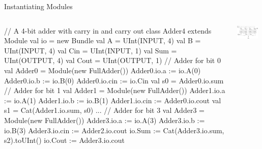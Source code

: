 \documentclass[xcolor=pdflatex,dvipsnames,table]{beamer}
\begin{document}
\begin{frame}[fragile]{Instantiating Modules}

\begin{columns}


{
\begin{scala}
// A 4-bit adder with carry in and carry out
class Adder4 extends Module {
  val io = new Bundle {
    val A    = UInt(INPUT, 4)
    val B    = UInt(INPUT, 4)
    val Cin  = UInt(INPUT, 1)
    val Sum  = UInt(OUTPUT, 4)
    val Cout = UInt(OUTPUT, 1)
  }
  // Adder for bit 0
  val Adder0 = Module(new FullAdder())
  Adder0.io.a   := io.A(0)
  Adder0.io.b   := io.B(0)
  Adder0.io.cin := io.Cin
  val s0 = Adder0.io.sum
  // Adder for bit 1
  val Adder1 = Module(new FullAdder())
  Adder1.io.a   := io.A(1)
  Adder1.io.b   := io.B(1)
  Adder1.io.cin := Adder0.io.cout
  val s1 = Cat(Adder1.io.sum, s0)
  ...
  // Adder for bit 3
  val Adder3 = Module(new FullAdder())
  Adder3.io.a   := io.A(3)
  Adder3.io.b   := io.B(3)
  Adder3.io.cin := Adder2.io.cout
  io.Sum  := Cat(Adder3.io.sum, s2).toUInt()
  io.Cout := Adder3.io.cout
}
\end{scala}
}


\includegraphics[width=0.9\textwidth]{../tootorial/03_module_instantiation/4_Bit_Adder.jpg}

\end{columns}

\end{frame}
\end{document}
